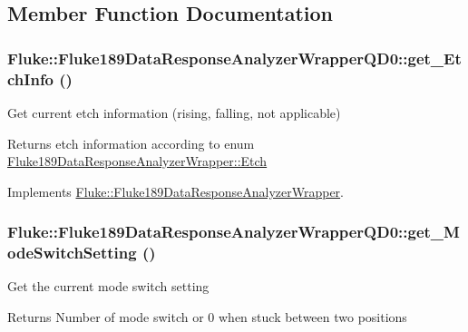 \subsection{Member Function Documentation}
\hypertarget{classFluke_1_1Fluke189DataResponseAnalyzerWrapperQD0_a8a50c55ebd21461e4c934a1eb4b07641}{
\subsubsection[{get\_\-EtchInfo}]{ Fluke::Fluke189DataResponseAnalyzerWrapperQD0::get\_\-EtchInfo ()}}
\label{classFluke_1_1Fluke189DataResponseAnalyzerWrapperQD0_a8a50c55ebd21461e4c934a1eb4b07641}
Get current etch information (rising, falling, not applicable) \begin{DoxyReturn}{Returns}
etch information according to enum \hyperlink{classFluke_1_1Fluke189DataResponseAnalyzerWrapper_ada71f6ab32a7b0eb40bb0ed96d7053bc}{Fluke189DataResponseAnalyzerWrapper::Etch} 
\end{DoxyReturn}


Implements \hyperlink{classFluke_1_1Fluke189DataResponseAnalyzerWrapper_a258e56c1ff27b8aae648940599d3b475}{Fluke::Fluke189DataResponseAnalyzerWrapper}.\hypertarget{classFluke_1_1Fluke189DataResponseAnalyzerWrapperQD0_ad28a17399ffe6a926990aafd5a1891d3}{
\subsubsection[{get\_\-ModeSwitchSetting}]{ Fluke::Fluke189DataResponseAnalyzerWrapperQD0::get\_\-ModeSwitchSetting ()}}
\label{classFluke_1_1Fluke189DataResponseAnalyzerWrapperQD0_ad28a17399ffe6a926990aafd5a1891d3}
Get the current mode switch setting \begin{DoxyReturn}{Returns}
Number of mode switch or 0 when stuck between two positions 
\end{DoxyReturn}


